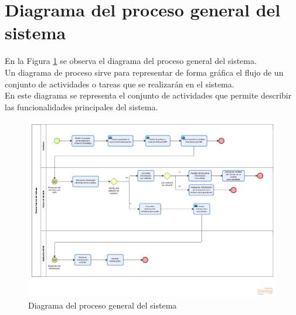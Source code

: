 \section{Diagrama del proceso general del sistema}
En la Figura \ref{fig:proceso_general} se observa el diagrama del proceso general del sistema.
\\
Un diagrama de proceso sirve para representar de forma gráfica el flujo de un conjunto de actividades o tareas que se realizarán en el sistema. 
\\
En este diagrama se representa el conjunto de actividades que permite describir las funcionalidades principales del sistema.
\begin{figure}[H]
	\centering
	\includegraphics[scale=.48]{Capitulo4/images/procesoGeneral}
	\caption{Diagrama del proceso general del sistema}
	\label{fig:proceso_general}
\end{figure}
